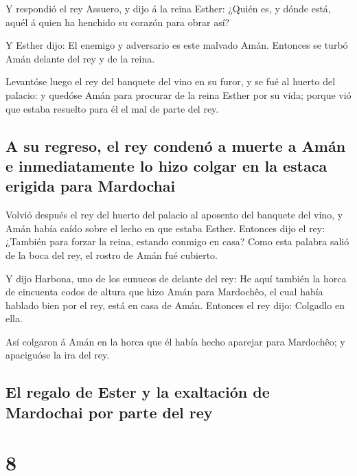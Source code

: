  Y respondió el rey Assuero, y dijo á la reina Esther:
¿Quién es, y dónde está, aquél á quien ha henchido su corazón para obrar
así?

 Y Esther dijo: El enemigo y adversario es este malvado
Amán. Entonces se turbó Amán delante del rey y de la reina.

 Levantóse luego el rey del banquete del vino en su furor,
y se fué al huerto del palacio: y quedóse Amán para procurar de la reina
Esther por su vida; porque vió que estaba resuelto para él el mal de
parte del rey.

\hypertarget{a-su-regreso-el-rey-condenuxf3-a-muerte-a-amuxe1n-e-inmediatamente-lo-hizo-colgar-en-la-estaca-erigida-para-mardochai}{%
\subsection{A su regreso, el rey condenó a muerte a Amán e
inmediatamente lo hizo colgar en la estaca erigida para
Mardochai}\label{a-su-regreso-el-rey-condenuxf3-a-muerte-a-amuxe1n-e-inmediatamente-lo-hizo-colgar-en-la-estaca-erigida-para-mardochai}}

 Volvió después el rey del huerto del palacio al aposento
del banquete del vino, y Amán había caído sobre el lecho en que estaba
Esther. Entonces dijo el rey: ¿También para forzar la reina, estando
conmigo en casa? Como esta palabra salió de la boca del rey, el rostro
de Amán fué cubierto.

 Y dijo Harbona, uno de los eunucos de delante del rey: He
aquí también la horca de cincuenta codos de altura que hizo Amán para
Mardochêo, el cual había hablado bien por el rey, está en casa de Amán.
Entonces el rey dijo: Colgadlo en ella.

 Así colgaron á Amán en la horca que él había hecho
aparejar para Mardochêo; y apaciguóse la ira del rey.

\hypertarget{el-regalo-de-ester-y-la-exaltaciuxf3n-de-mardochai-por-parte-del-rey}{%
\subsection{El regalo de Ester y la exaltación de Mardochai por parte
del
rey}\label{el-regalo-de-ester-y-la-exaltaciuxf3n-de-mardochai-por-parte-del-rey}}

\hypertarget{section-17-8}{%
\section{8}\label{section-17-8}}

